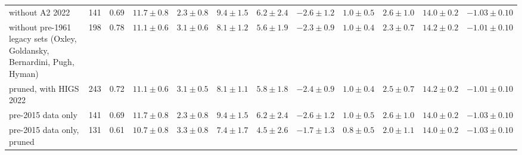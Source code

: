 \begin{tabular}{l r c cccc ccc cc}
without A2 2022 & 141 & 0.69 & $11.7\pm0.8$ & $2.3\pm0.8$ & $9.4\pm1.5$ & $6.2\pm2.4$ & $-2.6\pm1.2$ & $1.0\pm0.5$ & $2.6\pm1.0$ & $14.0\pm0.2$ & $-1.03\pm0.10$\\
without pre-1961 legacy sets (Oxley, Goldansky, Bernardini, Pugh, Hyman) & 198 & 0.78 & $11.1\pm0.6$ & $3.1\pm0.6$ & $8.1\pm1.2$ & $5.6\pm1.9$ & $-2.3\pm0.9$ & $1.0\pm0.4$ & $2.3\pm0.7$ & $14.2\pm0.2$ & $-1.01\pm0.10$\\
pruned, with HIGS 2022 & 243 & 0.72 & $11.1\pm0.6$ & $3.1\pm0.5$ & $8.1\pm1.1$ & $5.8\pm1.8$ & $-2.4\pm0.9$ & $1.0\pm0.4$ & $2.5\pm0.7$ & $14.2\pm0.2$ & $-1.01\pm0.10$\\
pre-2015 data only & 141 & 0.69 & $11.7\pm0.8$ & $2.3\pm0.8$ & $9.4\pm1.5$ & $6.2\pm2.4$ & $-2.6\pm1.2$ & $1.0\pm0.5$ & $2.6\pm1.0$ & $14.0\pm0.2$ & $-1.03\pm0.10$\\
pre-2015 data only, pruned & 131 & 0.61 & $10.7\pm0.8$ & $3.3\pm0.8$ & $7.4\pm1.7$ & $4.5\pm2.6$ & $-1.7\pm1.3$ & $0.8\pm0.5$ & $2.0\pm1.1$ & $14.0\pm0.2$ & $-1.03\pm0.10$\\
\hline
\end{tabular}

